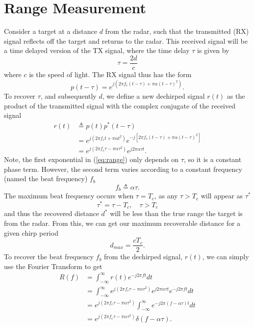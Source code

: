 \section{Range Measurement}
Consider a target at a distance $d$ from the radar, such that the transmitted
(RX) signal reflects off the target and returns to the radar. This received signal
will be a time delayed version of the TX signal, where the time delay $\tau$ is
given by
\begin{equation}
	\tau = \frac{2d}{c}
\end{equation}
where $c$ is the speed of light. The RX signal thus has the form
\begin{equation}
	p(t-\tau)=e^{j(2\pi f_c (t-\tau) + \pi\alpha (t-\tau)^2)}.
\end{equation}
To recover $\tau$, and subsequently $d$, we define a new dechirped signal $r(t)$
as the product of the transmitted signal with the complex conjugate of the
received signal
\begin{align}
	r(t) &\triangleq p(t)p^*(t-\tau) \\
	&= e^{j(2\pi f_c t + \pi \alpha t^2)}e^{-j[2\pi f_c (t-\tau) + \pi\alpha (t-\tau)^2 ]} \\
	&= e^{j(2\pi f_c \tau - \pi \alpha \tau^2)}e^{j2\pi\alpha\tau t}.\label{eq:range}
\end{align}
Note, the first exponential in (\ref{eq:range}) only depends on $\tau$, so it is
a constant phase term. However, the second term varies according to a constant
frequency (named the beat frequency) $f_b$
\begin{equation}
	f_b \triangleq \alpha \tau.
\end{equation}
The maximum beat frequency occurs when $\tau = T_c$, as any $\tau > T_c$ will
appear as $\tau^*$
\begin{equation}
	\tau^* = \tau - T_c, \quad \tau > T_c
\end{equation}
and thus the recovered distance $d^*$ will be less than the true range the
target is from the radar. From this, we can get our maximum recoverable distance
for a given chirp period
\begin{equation}
	d_{max} = \frac{c T_c}{2}.
\end{equation}
To recover the beat frequency $f_b$ from the dechirped signal, $r(t)$, we can
simply use the Fourier Transform to get
\begin{align}
	R(f) &= \int_{-\infty}^{\infty} r(t) e^{-j2 \pi ft} dt\\
	&= \int_{-\infty}^{\infty} e^{j(2\pi f_c \tau - \pi \alpha \tau^2)}e^{j2\pi\alpha\tau t} e^{-j2\pi ft}dt\\
	&= e^{j(2\pi f_c \tau - \pi \alpha
	\tau^2)}\int_{-\infty}^{\infty}e^{-j2\pi(f - \alpha\tau ) t} dt\\
	&= e^{j(2\pi f_c \tau - \pi \alpha \tau^2)}\delta (f - \alpha \tau).
\end{align}

